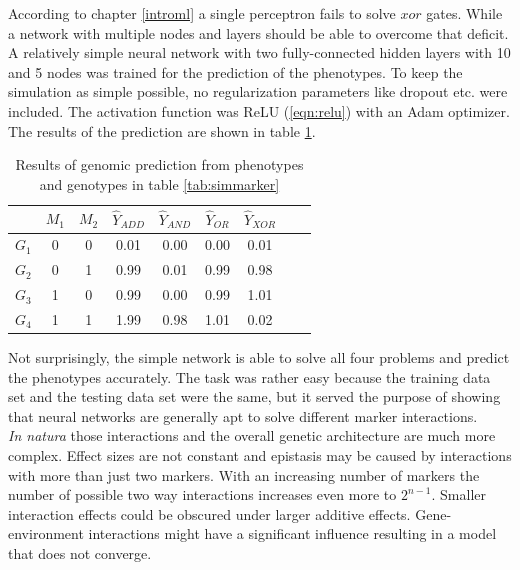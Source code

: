 According to chapter \ref{introml} a single perceptron fails to solve $xor$ gates. While a
network with multiple nodes and layers should be able to overcome that deficit. A
relatively simple neural network with two fully-connected hidden layers with 10 and 5
nodes was trained for the prediction of the phenotypes. To keep the simulation as simple
possible, no regularization parameters like dropout etc. were included. The activation
function was ReLU (\ref{eqn:relu}) with an Adam optimizer. The results of the prediction
are shown in table \ref{tab:simgpres}.

\begin{table}[H]
\caption{Results of genomic prediction from phenotypes and genotypes in table \ref{tab:simmarker}}
\label{tab:simgpres}
\centering
\begin{tabular}{ l c c | c c c c c c }
 \toprule
 & $M_1$ & $M_2$ & $\hat{Y}_{ADD}$ & $\hat{Y}_{AND}$ & $\hat{Y}_{OR}$ & $\hat{Y}_{XOR}$\\
 \midrule
 \hline 
 $G_1$ & 0 & 0 & 0.01 & 0.00 & 0.00 & 0.01 \\
 $G_2$ & 0 & 1 & 0.99 & 0.01 & 0.99 & 0.98 \\
 $G_3$ & 1 & 0 & 0.99 & 0.00 & 0.99 & 1.01 \\
 $G_4$ & 1 & 1 & 1.99 & 0.98 & 1.01 & 0.02 \\
 \bottomrule
\end{tabular}
\end{table}

Not surprisingly, the simple network is able to solve all four problems and predict the
phenotypes accurately. The task was rather easy because the training data set and the
testing data set were the same, but it served the purpose of showing that neural networks
are generally apt to solve different marker interactions. \\
\textit{In natura} those interactions and the overall genetic architecture are much more
complex. Effect sizes are not constant and epistasis may be caused by
interactions with more than just two markers. With an increasing number of markers the
number of possible two way interactions increases even more to $2^{n-1}$. Smaller
interaction effects could be obscured under larger additive effects. Gene-environment
interactions might have a significant influence resulting in a model that does not
converge.

